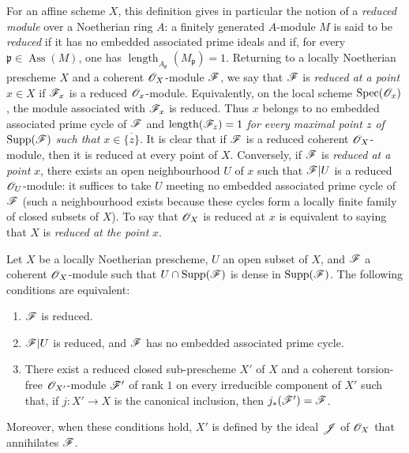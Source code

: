 For an affine scheme $X$, this definition gives in particular the notion of a \emph{reduced module} over a Noetherian ring $A$: a finitely generated $A$-module $M$ is said to be \emph{reduced} if it has no embedded associated prime ideals and if, for every $\mathfrak{p}\in\operatorname{Ass}(M)$, one has $\operatorname{length}_{A_\mathfrak{p}}(M_\mathfrak{p})=1$.
Returning to a locally Noetherian prescheme $X$ and a coherent $\mathscr{O}_X$-module $\mathscr{F}$, we say that $\mathscr{F}$ is \emph{reduced at a point} $x\in X$ if $\mathscr{F}_x$ is a reduced $\mathscr{O}_x$-module.  Equivalently, on the local scheme $\operatorname{Spec}(\mathscr{O}_x)$, the module associated with $\mathscr{F}_x$ is reduced.  Thus $x$ belongs to no embedded associated prime cycle of $\mathscr{F}$ and $\operatorname{length}(\mathscr{F}_z)=1$ \emph{for every maximal point $z$ of $\operatorname{Supp}(\mathscr{F})$ such that $x\in\overline{\{z\}}$}.
It is clear that if $\mathscr{F}$ is a reduced coherent $\mathscr{O}_X$-module, then it is reduced at every point of $X$.  Conversely, if $\mathscr{F}$ is \emph{reduced at a point} $x$, there exists an open neighbourhood $U$ of $x$ such that $\mathscr{F}|U$ is a reduced $\mathscr{O}_U$-module: it suffices to take $U$ meeting no embedded associated prime cycle of $\mathscr{F}$ (such a neighbourhood exists because these cycles form a locally finite family of closed subsets of $X$).
To say that $\mathscr{O}_X$ is reduced at $x$ is equivalent to saying that $X$ is \emph{reduced at the point} $x$.


\begin{proposition}[3.2.3]
\label{IV.3.2.3}
Let $X$ be a locally Noetherian prescheme, $U$ an open subset of $X$, and $\mathscr{F}$ a coherent $\mathscr{O}_X$-module such that $U\cap\operatorname{Supp}(\mathscr{F})$ is dense in $\operatorname{Supp}(\mathscr{F})$.
The following conditions are equivalent:
\begin{enumerate}
  \item[\emph{a)}] $\mathscr{F}$ is reduced.
  \item[\emph{b)}] $\mathscr{F}|U$ is reduced, and $\mathscr{F}$ has no embedded associated prime cycle.
  \item[\emph{c)}] There exist a reduced closed sub-prescheme $X'$ of $X$ and a coherent torsion-free $\mathscr{O}_{X'}$-module $\mathscr{F}'$ of rank $1$ on every irreducible component of $X'$ such that, if $j:X'\to X$ is the canonical inclusion, then $j_*(\mathscr{F}')=\mathscr{F}$.
\end{enumerate}
Moreover, when these conditions hold, $X'$ is defined by the ideal $\mathscr{J}$ of $\mathscr{O}_X$ that annihilates $\mathscr{F}$.
\end{proposition}

